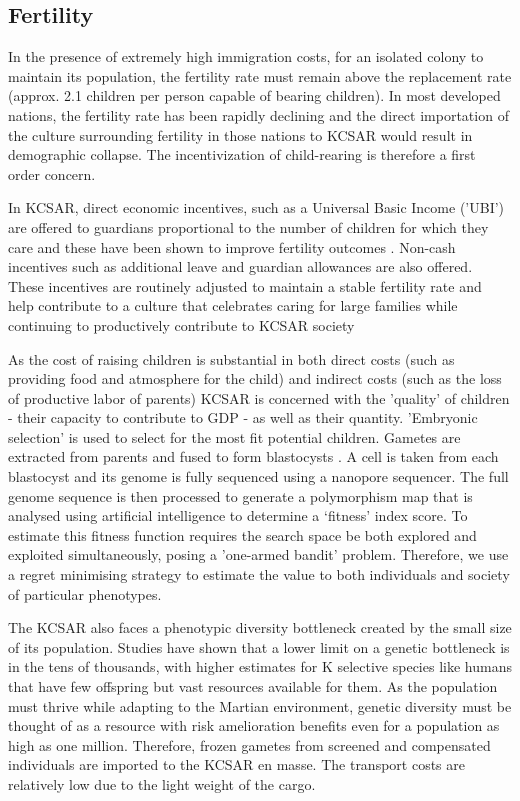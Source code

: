 \documentclass[fleqn,10pt]{Stylesheet} %
\begin{document}
\subsection{Fertility}
In the presence of extremely high immigration costs, for an isolated colony to maintain its population, the fertility rate must remain above the replacement rate (approx. 2.1 children per person capable of bearing children). In most developed nations, the fertility rate has been rapidly declining and the direct importation of the culture surrounding fertility in those nations to KCSAR would result in demographic collapse. The incentivization of child-rearing is therefore a first order concern.

In KCSAR, direct economic incentives, such as a Universal Basic Income ('UBI') are offered to guardians proportional to the number of children for which they care and these have been shown to improve fertility outcomes \cite{Kalwij, Bjorklund}. Non-cash incentives such as additional leave and guardian allowances are also offered. These incentives are routinely adjusted to maintain a stable fertility rate and help contribute to a culture that celebrates caring for large families while continuing to productively contribute to KCSAR society 
        
As the cost of raising children is substantial in both direct costs (such as providing food and atmosphere for the child) and indirect costs (such as the loss of productive labor of parents) KCSAR is concerned with the 'quality' of children - their capacity to contribute to GDP - as well as their quantity. 'Embryonic selection' is used to select for the most fit potential children. Gametes are extracted from parents and fused to form blastocysts \cite{Shulman}. A cell is taken from each blastocyst and its genome is fully sequenced using a nanopore sequencer. The full genome sequence is then processed to generate a polymorphism map that is analysed using artificial intelligence to determine a ‘fitness’ index score. To estimate this fitness function requires the search space be both explored and exploited simultaneously, posing a 'one-armed bandit' problem. Therefore, we use a regret minimising strategy to estimate the value to both individuals and society of particular phenotypes.

The KCSAR also faces a phenotypic diversity bottleneck created by the small size of its population. Studies have shown that a lower limit on a genetic bottleneck is in the tens of thousands, with higher estimates for K selective species like humans that have few offspring but vast resources available for them. As the population must thrive while adapting to the Martian environment, genetic diversity must be thought of as a resource with risk amelioration benefits even for a population as high as one million. Therefore, frozen gametes from screened and compensated individuals are imported to the KCSAR en masse. The transport costs are relatively low due to the light weight of the cargo.
\end{document}
